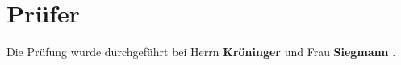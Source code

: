 \section{Prüfer}

Die Prüfung wurde durchgeführt bei Herrn \textbf{Kröninger} und Frau \textbf{Siegmann} .
